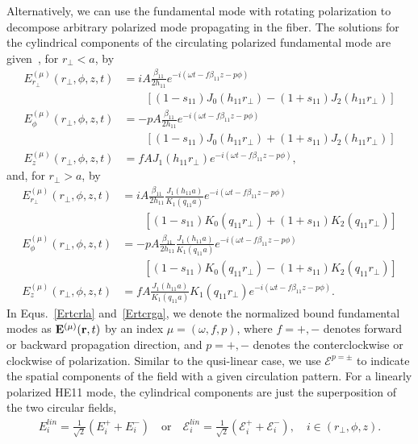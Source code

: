 Alternatively, we can use the fundamental mode with rotating polarization to decompose arbitrary polarized mode propagating in the fiber. The solutions for the cylindrical components of the circulating polarized fundamental mode are given~\cite{Lacroute2012,Vetsch2010a}, for $ r_\perp<a $, by
\begin{subequations}
\label{Ertcrla}
\begin{align}
E^{(\mu)}_{r_\perp}(r_\perp,\phi,z,t) &=iA\frac{\beta_{11}}{2h_{11}}e^{-i(\omega t-f\beta_{11} z -p\phi)}\nonumber\\
&\qquad \left[ (1-s_{11})J_0(h_{11}r_\perp)-(1+s_{11})J_2(h_{11}r_\perp) \right]\\
E^{(\mu)}_\phi(r_\perp,\phi,z,t) &=  -pA \frac{\beta_{11}}{2h_{11}}e^{-i(\omega t-f\beta_{11} z -p\phi)} \nonumber\\
&\qquad \left[ (1-s_{11})J_0(h_{11}r_\perp) +(1+s_{11})J_2(h_{11}r_\perp) \right] \\
E^{(\mu)}_z(r_\perp,\phi,z,t) &= fA J_1(h_{11}r_\perp) e^{-i(\omega t-f\beta_{11} z -p\phi)},
\end{align}
\end{subequations}
and, for $ r_\perp>a $, by
\begin{subequations}
\label{Ertcrga}
\begin{align}
E^{(\mu)}_{r_\perp}(r_\perp,\phi,z,t) &=iA\frac{\beta_{11}}{2h_{11}}\frac{J_1(h_{11}a)}{K_1(q_{11}a)}e^{-i(\omega t-f\beta_{11} z -p\phi)} \nonumber\\ 
&\qquad \left[ (1-s_{11})K_0(q_{11}r_\perp)+(1+s_{11})K_2(q_{11}r_\perp) \right]\\
E^{(\mu)}_\phi(r_\perp,\phi,z,t) &=  -pA \frac{\beta_{11}}{2h_{11}} \frac{J_1(h_{11}a)}{K_1(q_{11}a)}e^{-i(\omega t-f\beta_{11} z -p\phi)} \nonumber\\ 
&\qquad \left[ (1-s_{11})K_0(q_{11}r_\perp) - (1+s_{11})K_2(q_{11}r_\perp) \right] \\
E^{(\mu)}_z(r_\perp,\phi,z,t) &= fA \frac{J_1(h_{11}a)}{K_1(q_{11}a)} K_1(q_{11}r_\perp) e^{-i(\omega t-f\beta_{11} z -p\phi)}.
\end{align}
\end{subequations}
In Equs.~\ref{Ertcrla} and~\ref{Ertcrga}, we denote the normalized bound fundamental modes as $ \mathbf{E}^{(\mu)} (\mathbf{r},t)$ by an index $ \mu=(\omega,f,p) $, where $ f=+,- $ denotes forward or backward propagation direction, and $ p=+,- $ denotes the conterclockwise or clockwise of polarization. Similar to the qusi-linear case, we use $ \boldsymbol{\mathcal{E}}^{p=\pm} $ to indicate the spatial components of the field with a given circulation pattern. For a linearly polarized HE11 mode, the cylindrical components are just the superposition of the two circular fields, 
\begin{align}\label{Eilincyc}
E_i^{lin} = \frac{1}{\sqrt{2}}(E_i^+ + E_i^-)\quad \mathrm{or}\quad \mathcal{E}_i^{lin} = \frac{1}{\sqrt{2}}(\mathcal{E}_i^+ + \mathcal{E}_i^-),\quad i\in(r_\perp,\phi,z).
\end{align}

